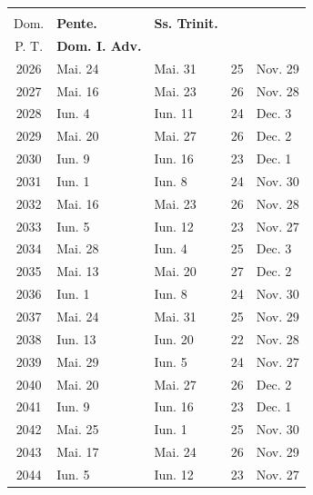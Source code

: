 \clearpage

\vspace{+.5em}

\begin{center}
\begin{tabular}{|c|l|l|c|l|}
\hline
\begin{minipage}[][.33in][]{.35in}\centering\textbf{Anno\\ Dom.}\end{minipage} & 
\textbf{Pente.} & 
\textbf{Ss. Trinit.} & 
\begin{minipage}[][.33in][]{.4in}\centering\textbf{Dom.\\ P. T.}\end{minipage} & 
\textbf{Dom. I. Adv.} \\
\hline
2026 & Mai. 24 & Mai. 31 & 25 & Nov. 29 \\
2027 & Mai. 16 & Mai. 23 & 26 & Nov. 28 \\
2028 & Iun. 4 & Iun. 11 & 24 & Dec. 3 \\
2029 & Mai. 20 & Mai. 27 & 26 & Dec. 2 \\
2030 & Iun. 9 & Iun. 16 & 23 & Dec. 1 \\
\hline
2031 & Iun. 1 & Iun. 8 & 24 & Nov. 30 \\
2032 & Mai. 16 & Mai. 23 & 26 & Nov. 28 \\
2033 & Iun. 5 & Iun. 12 & 23 & Nov. 27 \\
2034 & Mai. 28 & Iun. 4 & 25 & Dec. 3 \\
2035 & Mai. 13 & Mai. 20 & 27 & Dec. 2 \\
\hline
2036 & Iun. 1 & Iun. 8 & 24 & Nov. 30 \\
2037 & Mai. 24 & Mai. 31 & 25 & Nov. 29 \\
2038 & Iun. 13 & Iun. 20 & 22 & Nov. 28 \\
2039 & Mai. 29 & Iun. 5 & 24 & Nov. 27 \\
2040 & Mai. 20 & Mai. 27 & 26 & Dec. 2 \\
\hline
2041 & Iun. 9 & Iun. 16 & 23 & Dec. 1 \\
2042 & Mai. 25 & Iun. 1 & 25 & Nov. 30 \\
2043 & Mai. 17 & Mai. 24 & 26 & Nov. 29 \\
2044 & Iun. 5 & Iun. 12 & 23 & Nov. 27 \\

\end{tabular}
\end{center}
